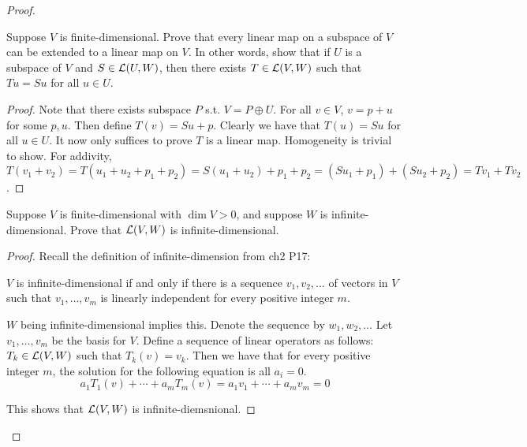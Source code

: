 \documentclass{extarticle}
\begin{document}
\begin{proof}
\begin{problem}{13}
    Suppose \(V\) is finite-dimensional. Prove that every linear map on a subspace of \(V\) can 
    be extended to a linear map on \(V\). In other words, show that if \(U\) is a subspace of 
    \(V\) and \(S \in \mathcal{L}(U, W)\), then there exists \(T \in \mathcal{L}(V, W)\) such that 
    \(Tu = Su\) for all \(u \in U\).
\end{problem}

\begin{proof}

Note that there exists subspace \(P\) s.t. \(V = P \oplus U\). For all \(v \in V\),
\(v = p + u\) for some \(p, u\). Then define \(T(v) = Su + p\). Clearly we have that 
\(T(u) = Su \) for all \(u \in U\). It now only suffices to prove \(T\) is a linear map.
Homogeneity is trivial to show. For addivity, \(T(v_1 + v_2) = T(u_1 + u_2 + p_1 + p_2)
= S(u_1 + u_2) + p_1 + p_2 = (S u_1 + p_1) + (S u_2 + p_2) = Tv_1 + T v_2\).

\end{proof}


\begin{problem}{14}
    Suppose \(V\)  is finite-dimensional with \(\dim V > 0\), and suppose \(W\)
    is infinite-dimensional. Prove that \(\mathcal{L} (V, W)\) is infinite-dimensional. 
\end{problem}

\begin{proof}
Recall the definition of infinite-dimension from ch2 P17:

\begin{center}
    \(V\) is infinite-dimensional if and only if there is a sequence 
    \(v_1, v_2, \ldots\) of vectors in \(V\) such that \(v_1, \ldots, v_m\)
    is linearly independent for every positive integer \(m\). 
\end{center}

\(W\) being infinite-dimensional implies this. Denote the sequence by \(w_1, w_2, \ldots\)
 Let \(v_1, \ldots, v_m\) be the basis for \(V\). 
Define a sequence of linear operators as follows: \(T_k \in \mathcal{L}(V, W)\) such that \(T_k (v) = v_k\). 
Then we have that for every positive integer \(m\), the solution for the following equation 
is all \(a_i = 0\). 
\[a_1T_1(v) + \cdots + a_m T_m(v) = a_1 v_1 + \cdots + a_m v_m = 0\]

This shows that \(\mathcal{L}(V, W)\) is infinite-diemsnional.


\end{proof}


\end{proof}
\end{document}
